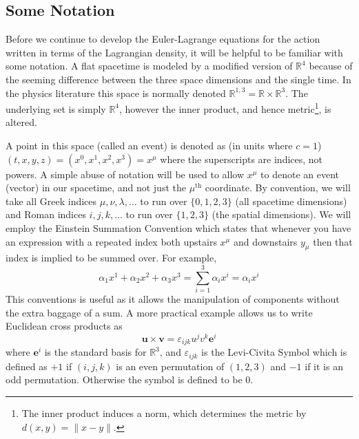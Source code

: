 \subsection{Some Notation}\label{sec:notation}
Before we continue to develop the Euler-Lagrange equations for the action
written in terms of the Lagrangian density, it will be helpful to be familiar
with some notation. A flat spacetime is modeled by a modified version of
\(\mathbb{R}^4\) because of the seeming difference between the three space
dimensions and the single time. In the physics literature this space is normally
denoted \(\mathbb{R}^{1,3} = \mathbb{R}\times\mathbb{R}^3\). The underlying set
is simply \(\mathbb{R}^4\), however the inner product, and hence
metric\footnote{The inner product induces a norm, which determines the metric by
    \(d(x,y) = \|x - y\|\).}, is altered.

A point in this space (called an event) is denoted as (in units where \(c = 1\))
\((t, x, y, z) = (x^0, x^1, x^2, x^3) = x^\mu\) where the superscripts are
indices, not powers. A simple abuse of notation will be used to allow \(x^\mu\)
to denote an event (vector) in our spacetime, and not just the \(\mu^\text{th}\)
coordinate. By convention, we will take all Greek indices
\(\mu, \nu, \lambda, \ldots\) to run over \(\{0,1,2,3\}\) (all spacetime
dimensions) and Roman indices \(i, j, k, \ldots\) to run over \(\{1,2,3\}\)
(the spatial dimensions). We will employ the Einstein Summation Convention which
states that whenever you have an expression with a repeated index both upstairs
\(x^\mu\) and downstairs \(y_\mu\) then that index is implied to be summed over.
For example,
\begin{equation}
    \alpha_1x^1 + \alpha_2x^2 + \alpha_3x^3 = \sum_{i = 1}^3\alpha_i x^i = \alpha_i x^i
\end{equation}
This conventions is useful as it allows the manipulation of components without
the extra baggage of a sum. A more practical example allows us to write
Euclidean cross products as
\begin{equation}
    \mathbf{u}\times\mathbf{v} = \varepsilon_{ijk}u^j v^k\mathbf{e}^i
\end{equation}
where \(\mathbf{e}^i\) is the standard basis for \(\mathbb{R}^3\), and
\(\varepsilon_{ijk}\) is the Levi-Civita Symbol which is defined as \(+1\) if
\((i, j, k)\) is an even permutation of \((1,2,3)\) and \(-1\) if it is an odd
permutation. Otherwise the symbol is defined to be 0.

